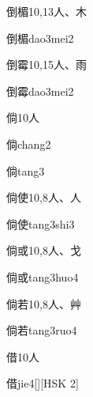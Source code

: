 \begin{Entry}{倒楣}{10,13}{⼈、⽊}
  \begin{Phonetics}{倒楣}{dao3mei2}
  \end{Phonetics}
\end{Entry}

\begin{Entry}{倒霉}{10,15}{⼈、⾬}
  \begin{Phonetics}{倒霉}{dao3mei2}
  \end{Phonetics}
\end{Entry}

\begin{Entry}{倘}{10}{⼈}
  \begin{Phonetics}{倘}{chang2}
  \end{Phonetics}
  \begin{Phonetics}{倘}{tang3}
  \end{Phonetics}
\end{Entry}

\begin{Entry}{倘使}{10,8}{⼈、⼈}
  \begin{Phonetics}{倘使}{tang3shi3}
  \end{Phonetics}
\end{Entry}

\begin{Entry}{倘或}{10,8}{⼈、⼽}
  \begin{Phonetics}{倘或}{tang3huo4}
  \end{Phonetics}
\end{Entry}

\begin{Entry}{倘若}{10,8}{⼈、⾋}
  \begin{Phonetics}{倘若}{tang3ruo4}
  \end{Phonetics}
\end{Entry}

\begin{Entry}{借}{10}{⼈}
  \begin{Phonetics}{借}{jie4}[][HSK 2]
  \end{Phonetics}
\end{Entry}

